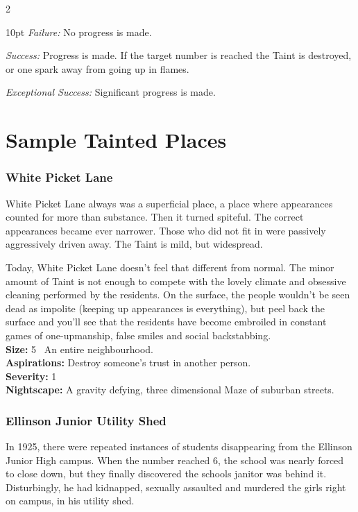 \begin{multicols}{2}
\begin{myindentpar}{10pt}
    \emph{Failure:} No progress is made. 

    \emph{Success:} Progress is made. If the target number is reached the Taint is destroyed, or one spark away from going up in flames. 

    \emph{Exceptional Success:} Significant progress is made.

\end{myindentpar}

\section*{Sample Tainted Places} 

\subsubsection*{White Picket Lane}
White Picket Lane always was a superficial place, a place where appearances counted for more than substance. Then it turned spiteful. The correct appearances became ever narrower. Those who did not fit in were passively aggressively driven away. The Taint is mild, but widespread.

Today, White Picket Lane doesn’t feel that different from normal. The minor amount of Taint is not enough to compete with the lovely climate and obsessive cleaning performed by the residents. On the surface, the people wouldn't be seen dead as impolite (keeping up appearances is everything), but peel back the surface and you'll see that the residents have become embroiled in constant games of one-upmanship, false smiles and social backstabbing. \\
\textbf{Size:} 5 \textemdash\, An entire neighbourhood. \\
\textbf{Aspirations:} Destroy someone's trust in another person.\\
\textbf{Severity:} 1\\
\textbf{Nightscape:} A gravity defying, three dimensional Maze of suburban streets.

\subsubsection*{Ellinson Junior Utility Shed}
In 1925, there were repeated instances of students disappearing from the Ellinson Junior High campus. When the number reached 6, the school was nearly forced to close down, but they finally discovered the schools janitor was behind it. Disturbingly, he had kidnapped, sexually assaulted and murdered the girls right on campus, in his utility shed.


\end{multicols}
